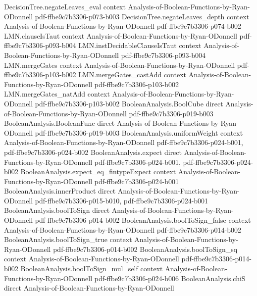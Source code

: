 \begin{theorem}
  {DecisionTree.negateLeaves_eval}
  {context}
  {Analysis-of-Boolean-Functions-by-Ryan-ODonnell}
  {pdf-ffbe9c7b3306-p073-b003}
\proofstep
  {DecisionTree.negateLeaves_depth}
  {context}
  {Analysis-of-Boolean-Functions-by-Ryan-ODonnell}
  {pdf-ffbe9c7b3306-p074-b002}
\proofstep
  {LMN.clauseIsTaut}
  {context}
  {Analysis-of-Boolean-Functions-by-Ryan-ODonnell}
  {pdf-ffbe9c7b3306-p093-b004}
\proofstep
  {LMN.instDecidableClauseIsTaut}
  {context}
  {Analysis-of-Boolean-Functions-by-Ryan-ODonnell}
  {pdf-ffbe9c7b3306-p093-b004}
\proofstep
  {LMN.mergeGates}
  {context}
  {Analysis-of-Boolean-Functions-by-Ryan-ODonnell}
  {pdf-ffbe9c7b3306-p103-b002}
\proofstep
  {LMN.mergeGates_castAdd}
  {context}
  {Analysis-of-Boolean-Functions-by-Ryan-ODonnell}
  {pdf-ffbe9c7b3306-p103-b002}
\proofstep
  {LMN.mergeGates_natAdd}
  {context}
  {Analysis-of-Boolean-Functions-by-Ryan-ODonnell}
  {pdf-ffbe9c7b3306-p103-b002}
\proofstep
  {BooleanAnalysis.BoolCube}
  {direct}
  {Analysis-of-Boolean-Functions-by-Ryan-ODonnell}
  {pdf-ffbe9c7b3306-p019-b003}
\proofstep
  {BooleanAnalysis.BooleanFunc}
  {direct}
  {Analysis-of-Boolean-Functions-by-Ryan-ODonnell}
  {pdf-ffbe9c7b3306-p019-b003}
\proofstep
  {BooleanAnalysis.uniformWeight}
  {context}
  {Analysis-of-Boolean-Functions-by-Ryan-ODonnell}
  {pdf-ffbe9c7b3306-p024-b001,
    pdf-ffbe9c7b3306-p024-b002}
\proofstep
  {BooleanAnalysis.expect}
  {direct}
  {Analysis-of-Boolean-Functions-by-Ryan-ODonnell}
  {pdf-ffbe9c7b3306-p024-b001,
    pdf-ffbe9c7b3306-p024-b002}
\proofstep
  {BooleanAnalysis.expect_eq_fintypeExpect}
  {context}
  {Analysis-of-Boolean-Functions-by-Ryan-ODonnell}
  {pdf-ffbe9c7b3306-p024-b001}
\proofstep
  {BooleanAnalysis.innerProduct}
  {direct}
  {Analysis-of-Boolean-Functions-by-Ryan-ODonnell}
  {pdf-ffbe9c7b3306-p015-b010,
    pdf-ffbe9c7b3306-p024-b001}
\proofstep
  {BooleanAnalysis.boolToSign}
  {direct}
  {Analysis-of-Boolean-Functions-by-Ryan-ODonnell}
  {pdf-ffbe9c7b3306-p014-b002}
\proofstep
  {BooleanAnalysis.boolToSign_false}
  {context}
  {Analysis-of-Boolean-Functions-by-Ryan-ODonnell}
  {pdf-ffbe9c7b3306-p014-b002}
\proofstep
  {BooleanAnalysis.boolToSign_true}
  {context}
  {Analysis-of-Boolean-Functions-by-Ryan-ODonnell}
  {pdf-ffbe9c7b3306-p014-b002}
\proofstep
  {BooleanAnalysis.boolToSign_sq}
  {context}
  {Analysis-of-Boolean-Functions-by-Ryan-ODonnell}
  {pdf-ffbe9c7b3306-p014-b002}
\proofstep
  {BooleanAnalysis.boolToSign_mul_self}
  {context}
  {Analysis-of-Boolean-Functions-by-Ryan-ODonnell}
  {pdf-ffbe9c7b3306-p024-b006}
\proofstep
  {BooleanAnalysis.chiS}
  {direct}
  {Analysis-of-Boolean-Functions-by-Ryan-ODonnell}

\end{theorem}
